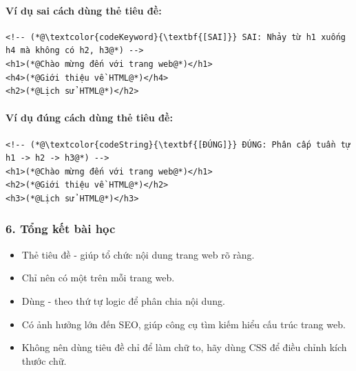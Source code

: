 \paragraph{Ví dụ sai cách dùng thẻ tiêu đề:}
\begin{codeWindow}
\begin{lstlisting}[language=HTML5]
<!-- (*@\textcolor{codeKeyword}{\textbf{[SAI]}} SAI: Nhảy từ h1 xuống h4 mà không có h2, h3@*) -->
<h1>(*@Chào mừng đến với trang web@*)</h1>
<h4>(*@Giới thiệu về HTML@*)</h4>
<h2>(*@Lịch sử HTML@*)</h2>
\end{lstlisting}
\end{codeWindow}

\paragraph{Ví dụ đúng cách dùng thẻ tiêu đề:}
\begin{codeWindow}
\begin{lstlisting}[language=HTML5]
<!-- (*@\textcolor{codeString}{\textbf{[ĐÚNG]}} ĐÚNG: Phân cấp tuần tự h1 -> h2 -> h3@*) -->
<h1>(*@Chào mừng đến với trang web@*)</h1>
<h2>(*@Giới thiệu về HTML@*)</h2>
<h3>(*@Lịch sử HTML@*)</h3>
\end{lstlisting}
\end{codeWindow}

\subsubsection{6. Tổng kết bài học}

\begin{noteBox}
\begin{itemize}[leftmargin=1.5em, itemsep=2pt, parsep=0pt]
    \item Thẻ tiêu đề  -  giúp tổ chức nội dung trang web rõ ràng.
    \item Chỉ nên có một  trên mỗi trang web.
    \item Dùng  -  theo thứ tự logic để phân chia nội dung.
    \item Có ảnh hưởng lớn đến SEO, giúp công cụ tìm kiếm hiểu cấu trúc trang web.
    \item Không nên dùng tiêu đề chỉ để làm chữ to, hãy dùng CSS để điều chỉnh kích thước chữ.
\end{itemize}
\end{noteBox}

